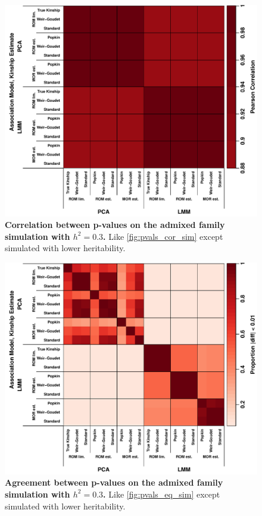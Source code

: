 \documentclass[11pt]{article}
\begin{document}
\begin{figure}[bp!]
  \centering
  \includegraphics[width=\textwidth]{sim-admix-n1000-m100000-k3-f0.3-s0.5-g20/h-0.3/pvals_cor.pdf}
  \caption{
    {\bf Correlation between p-values on the admixed family simulation with $h^2=0.3$.}
    Like \cref{fig:pvals_cor_sim} except simulated with lower heritability.
    }
  \label{fig:pvals_cor_sim-h3}
\end{figure}

\begin{figure}[bp!]
  \centering
  \includegraphics[width=\textwidth]{sim-admix-n1000-m100000-k3-f0.3-s0.5-g20/h-0.3/pvals_eq.pdf}
  \caption{
    {\bf Agreement between p-values on the admixed family simulation with $h^2=0.3$.}
    Like \cref{fig:pvals_eq_sim} except simulated with lower heritability.
    }
  \label{fig:pvals_eq_sim-h3}
\end{figure}
\end{document}
